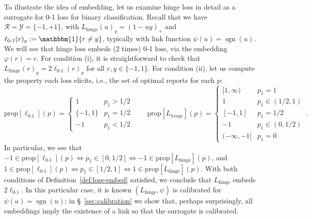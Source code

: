 \documentclass[11pt]{article}
\newcommand{\prop}[1]{\mathrm{prop}[#1]}
\newcommand{\R}{\mathcal{R}}
\newcommand{\Y}{\mathcal{Y}}
\newcommand{\ones}{\mathbbm{1}}
\newcommand{\Ind}[1]{\ones\{#1\}}
\newcommand{\hinge}{L_{\mathrm{hinge}}}
\newcommand{\ellzo}{\ell_{\text{0-1}}}
\DeclareMathOperator*{\sgn}{sgn}
\begin{document}
To illustrate the idea of embedding, let us examine hinge loss in detail as a surrogate for 0-1 loss for binary classification.
Recall that we have $\R = \Y = \{-1, +1\}$, with $\hinge(u)_y = (1 - uy)_+$ and $\ellzo(r)_y := \Ind{r\neq y}$, typically with link function $\psi(u) = \sgn(u)$.
We will see that hinge loss embeds (2 times) 0-1 loss, via the embedding $\varphi(r) = r$.
For condition (i), it is straightforward to check that $\hinge(r)_y = 2\ellzo(r)_y$ for all $r,y\in\{-1,1\}$.
For condition (ii), let us compute the property each loss elicits, i.e., the set of optimal reports for each $p$:
\[
\prop{\ellzo}(p) = \begin{cases}
1 & p_1 > 1/2 \\
\{-1,1\} & p_1 = 1/2\\
-1 & p_1 < 1/2
\end{cases}
\qquad
\prop{L_{hinge}}(p) = \begin{cases}
[1,\infty) & p_1 = 1\\
1 & p_1 \in (1/2,1) \\
[-1,1] & p_1 = 1/2\\
-1& p_1 \in (0, 1/2)\\
(-\infty, -1]& p_1 = 0
\end{cases}~.
\]
In particular, we see that $-1 \in \prop{\ellzo}(p) \iff p_1 \in [0, 1/2] \iff -1 \in \prop{\hinge}(p)$, and $1 \in \prop{\ellzo}(p) \iff p_1 \in [1/2,1] \iff 1 \in \prop{\hinge}(p)$.
With both conditions of Definition~\ref{def:loss-embed} satisfied, we conclude that $\hinge$ embeds $2\ellzo$.
In this particular case, it is known $(\hinge,\psi)$ is calibrated for $\psi(u) = \sgn(u)$; in \S~\ref{sec:calibration} we show that, perhaps surprisingly, all embeddings imply the existence of a link so that the surrogate is calibrated.
\end{document}
